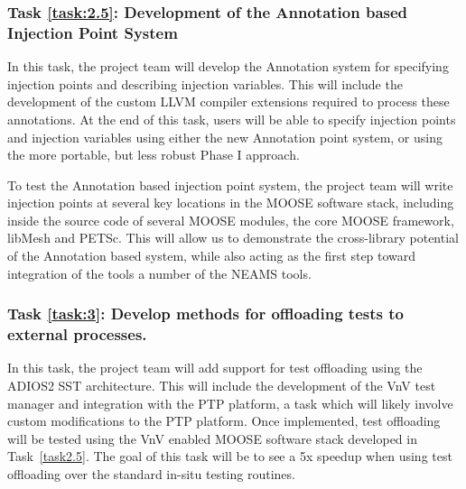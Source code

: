 \setcounter{taskCount}{0}

\label{task:2.5}
\subsubsection{Task \ref{task:2.5}: Development of the Annotation based Injection Point System  }

In this task, the project team will develop the Annotation system for specifying injection points and describing injection variables. This will include the development of
the custom LLVM compiler extensions required to process these annotations. At the end of this task, users will be able to specify injection points and injection variables using either the new Annotation point system, or using the more portable, but less robust Phase I approach. 

To test the Annotation based injection point system, the project team will write injection points at several key locations in the MOOSE software stack, including inside the source code of several MOOSE modules, the core MOOSE framework, libMesh and PETSc. This will allow us to demonstrate the cross-library potential of the Annotation based system, while also acting as the first step toward integration of the tools a number of the NEAMS tools. 



\label{task:3}
\subsubsection{Task \ref{task:3}: Develop methods for offloading tests to external processes. }

In this task, the project team will add support for test offloading using the ADIOS2 SST architecture. This will include 
the development of the VnV test manager and integration with the PTP platform, a task which will likely involve custom modifications
to the PTP platform. Once implemented, test offloading will be tested using the VnV enabled MOOSE software stack developed in Task~\ref{task2.5}. The 
goal of this task will be to see a 5x speedup when using test offloading over the standard in-situ testing routines. 


